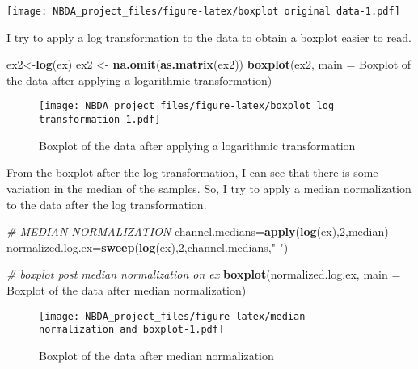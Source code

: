 \documentclass[
]{article}
\newenvironment{Shaded}{\begin{snugshade}}{\end{snugshade}}
\newcommand{\AttributeTok}[1]{\textcolor[rgb]{0.13,0.29,0.53}{#1}}
\newcommand{\CommentTok}[1]{\textcolor[rgb]{0.56,0.35,0.01}{\textit{#1}}}
\newcommand{\DecValTok}[1]{\textcolor[rgb]{0.00,0.00,0.81}{#1}}
\newcommand{\FunctionTok}[1]{\textcolor[rgb]{0.13,0.29,0.53}{\textbf{#1}}}
\newcommand{\NormalTok}[1]{#1}
\newcommand{\OtherTok}[1]{\textcolor[rgb]{0.56,0.35,0.01}{#1}}
\newcommand{\StringTok}[1]{\textcolor[rgb]{0.31,0.60,0.02}{#1}}
\begin{document}
\texttt{[image: NBDA\_project\_files/figure-latex/boxplot original data-1.pdf]}

I try to apply a log transformation to the data to obtain a boxplot
easier to read.

\begin{Shaded}
\begin{Highlighting}[]
\NormalTok{ex2}\OtherTok{\textless{}{-}}\FunctionTok{log}\NormalTok{(ex)}
\NormalTok{ex2 }\OtherTok{\textless{}{-}} \FunctionTok{na.omit}\NormalTok{(}\FunctionTok{as.matrix}\NormalTok{(ex2))}
\FunctionTok{boxplot}\NormalTok{(ex2, }\AttributeTok{main =} \StringTok{\textquotesingle{}Boxplot of the data after applying a logarithmic transformation\textquotesingle{}}\NormalTok{)}
\end{Highlighting}
\end{Shaded}

\begin{figure}
\centering
\texttt{[image: NBDA\_project\_files/figure-latex/boxplot log transformation-1.pdf]}
\caption{Boxplot of the data after applying a logarithmic
transformation}
\end{figure}

From the boxplot after the log transformation, I can see that there is
some variation in the median of the samples. So, I try to apply a median
normalization to the data after the log transformation.

\begin{Shaded}
\begin{Highlighting}[]
\CommentTok{\# MEDIAN NORMALIZATION}
\NormalTok{channel.medians}\OtherTok{=}\FunctionTok{apply}\NormalTok{(}\FunctionTok{log}\NormalTok{(ex),}\DecValTok{2}\NormalTok{,median)}
\NormalTok{normalized.log.ex}\OtherTok{=}\FunctionTok{sweep}\NormalTok{(}\FunctionTok{log}\NormalTok{(ex),}\DecValTok{2}\NormalTok{,channel.medians,}\StringTok{"{-}"}\NormalTok{)}

\CommentTok{\# boxplot post median normalization on ex}
\FunctionTok{boxplot}\NormalTok{(normalized.log.ex, }\AttributeTok{main =} \StringTok{\textquotesingle{}Boxplot of the data after median normalization\textquotesingle{}}\NormalTok{)}
\end{Highlighting}
\end{Shaded}

\begin{figure}
\centering
\texttt{[image: NBDA\_project\_files/figure-latex/median normalization and boxplot-1.pdf]}
\caption{Boxplot of the data after median normalization}
\end{figure}
\end{document}
